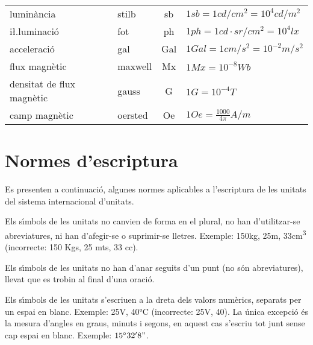 \begin{longtable}[h]{llcl}
    lumin\`{a}ncia & stilb & \unit{sb} & $1\unit{sb} = 1\unit{cd/cm^2} = 10^4\unit{cd/m^2}$ \\
    i{\l.l}uminaci\'{o} & fot & \unit{ph} & $1\unit{ph} = 1\unit{cd\cdot sr/cm^2} = 10^4\unit{lx}$ \\
    acceleraci\'{o} & gal & \unit{Gal} & $1\unit{Gal} = 1\unit{cm/s^2} = 10^{-2}\unit{m/s^2}$ \\
    flux magn\`{e}tic & maxwell & \unit{Mx} & $1\unit{Mx} = 10^{-8}\unit{Wb}$ \\
    densitat de flux magn\`{e}tic & gauss & \unit{G} & $1\unit{G} = 10^{-4}\unit{T}$ \\
    camp magn\`{e}tic & oersted & \unit{Oe} & $1\unit{Oe} = \frac{1000}{4\pi}\unit{A/m}$ \\
\bottomrule[1pt]
\end{longtable}

\section{Normes d'escriptura}

Es presenten a continuaci\'{o}, algunes normes aplicables a l'escriptura
de les unitats del sistema internacional d'unitats.

Els s\'{\i}mbols de les unitats no canvien de forma en el plural, no han
d'utilitzar-se abreviatures, ni han d'afegir-se o suprimir-se
lletres. Exemple: 150\unit{kg}, 25\unit{m},  33\unit{cm^3}
(incorrecte: 150 Kgs, 25 mts, 33 cc).

Els s\'{\i}mbols de les unitats no han d'anar seguits d'un punt (no s\'{o}n
abreviatures), llevat que es trobin al final d'una oraci\'{o}.

Els s\'{\i}mbols de les unitats s'escriuen a la dreta dels valors
num\`{e}rics, separats per un espai en blanc. Exemple: 25\unit{V},
40\unit{\celsius} (incorrecte: 25V, 40\celsius). La \'{u}nica excepci\'{o} \'{e}s la mesura d'angles en graus, minuts i segons, en aquest cas s'escriu tot junt sense cap espai en blanc. Exemple: $15^\circ{}32'8"$.


